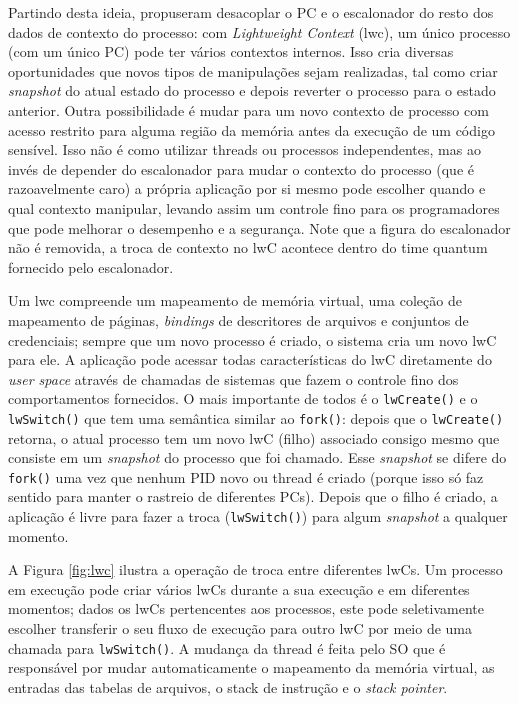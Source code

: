 Partindo desta ideia, \cite{litton} propuseram desacoplar o PC e o escalonador
do resto dos dados de contexto do processo: com \emph{Lightweight Context}
(lwc), um único processo (com um único PC) pode ter vários contextos internos.
Isso cria diversas oportunidades que novos tipos de manipulações sejam
realizadas, tal como criar \emph{snapshot} do atual estado do processo e depois
reverter o processo para o estado anterior. Outra possibilidade é mudar para um
novo contexto de processo com acesso restrito para alguma região da memória
antes da execução de um código sensível. Isso não é como utilizar threads ou
processos independentes, mas ao invés de depender do escalonador para mudar o
contexto do processo (que é razoavelmente caro) a própria aplicação por si
mesmo pode escolher quando e qual contexto manipular, levando assim um controle
fino para os programadores que pode melhorar o desempenho e a segurança. Note
que a figura do escalonador não é removida, a troca de contexto no lwC acontece
dentro do time quantum fornecido pelo escalonador.

Um lwc compreende um mapeamento de memória virtual, uma coleção de mapeamento
de páginas, \emph{bindings} de descritores de arquivos e conjuntos de
credenciais; sempre que um novo processo é criado, o sistema cria um novo lwC
para ele. A aplicação pode acessar todas características do lwC diretamente do
\textit{user space} através de chamadas de sistemas que fazem o controle fino
dos comportamentos fornecidos. O mais importante de todos é o
\texttt{lwCreate()} e o \texttt{lwSwitch()} que tem uma semântica similar ao
\texttt{fork()}: depois que o \texttt{lwCreate()} retorna, o atual processo tem
um novo lwC (filho) associado consigo mesmo que consiste em um \emph{snapshot}
do processo que foi chamado. Esse \emph{snapshot} se difere do \texttt{fork()}
uma vez que nenhum PID novo ou thread é criado (porque isso só faz sentido para
manter o rastreio de diferentes PCs). Depois que o filho é criado, a aplicação
é livre para fazer a troca (\texttt{lwSwitch()}) para algum \emph{snapshot} a
qualquer momento.

A Figura \ref{fig:lwc} ilustra a operação de troca entre diferentes lwCs. Um
processo em execução pode criar vários lwCs durante a sua execução e em
diferentes momentos; dados os lwCs pertencentes aos processos, este pode
seletivamente escolher transferir o seu fluxo de execução para outro lwC por
meio de uma chamada para \texttt{lwSwitch()}. A mudança da thread é feita pelo
SO que é responsável por mudar automaticamente o mapeamento da memória virtual,
as entradas das tabelas de arquivos, o stack de instrução e o \emph{stack
pointer}.

